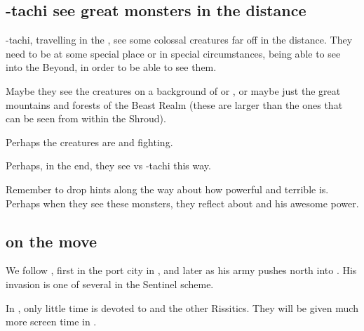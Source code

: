 \begin{garbage}
\subsection{\Shilred{}-tachi see great monsters in the distance}
\Shilred-tachi, travelling in the \Wylde{}, see some colossal creatures far off in the distance. They need to be at some special place or in special circumstances, being able to see into the Beyond, in order to be able to see them. 

Maybe they see the creatures on a background of \Nyx{} or \Machai{}, or maybe just the great mountains and forests of the Beast Realm (these are larger than the ones that can be seen from within the Shroud). 

Perhaps the creatures are \dragons{} and \banes{} fighting. 

Perhaps, in the end, they see \Ishnaruchaefir{} vs \Teshrial-tachi this way. 

Remember to drop hints along the way about how powerful and terrible \Ishnaruchaefir{} is. Perhaps when they see these monsters, they reflect about \Ishnaruchaefir{} and his awesome power. 







\subsection{\Narkiza{} on the move}

We follow \Narkiza{}, first in the port city in \Scyrum, and later as his army pushes north into \Velcad{}. His invasion is one of several  in the Sentinel scheme.

In \emph{\RungerWarBook}, only little time is devoted to \Narkiza{} and the other Rissitics. They will be given much more screen time in \emph{\CarzainWithRedcorBook}. 














\end{garbage}
